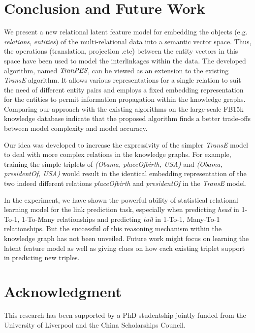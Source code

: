 \documentclass[9pt]{sig-alternate-05-2015}
\begin{document}
\section{Conclusion and Future Work} \label{conclusion}
We present a new relational latent feature model for embedding the objects (e.g. \emph{relations}, \emph{entities}) of the multi-relational data into a semantic vector space.  Thus, the operations (translation, projection .etc) between the entity vectors in this space have been used to model the interlinkages within the  data. The developed algorithm, named $\emph{TranPES}$, can be viewed as an extension to the existing \emph{TransE} algorithm. It allows various  representations for a single relation to suit the need of different entity pairs and employs a fixed embedding representation for the entities  to permit  information propagation within the knowledge graphs.  Comparing our approach with the existing algorithms on the large-scale FB15k knowledge database indicate that the proposed algorithm finds a better trade-offs between model complexity and model accuracy.

Our idea was developed to increase the expressivity of the simpler \emph{TransE} model to deal with  more complex relations in the knowledge graphs. For example, training the simple triplets of \emph{(Obama, placeOfbirth, USA)} and \emph{(Obama, presidentOf, USA)} would result in the identical embedding representation of the two indeed different relations \emph{placeOfbirth} and \emph{presidentOf}  in the \emph{TransE} model. 

In the experiment, we have shown the powerful ability of statistical relational learning model for the link prediction task, especially when predicting \emph{head}  in 1-To-1, 1-To-Many relationships  and predicting \emph{tail} in 1-To-1, Many-To-1 relationships. But the successful of this reasoning mechanism within the knowledge graph has not been unveiled. Future work might focus on  learning the latent feature model as well as giving clues on how each existing triplet support in predicting new triples.

\section*{Acknowledgment}
This research has been supported by a PhD studentship jointly funded from the University of Liverpool and the China Scholarships Council.





\balancecolumns
\end{document}
